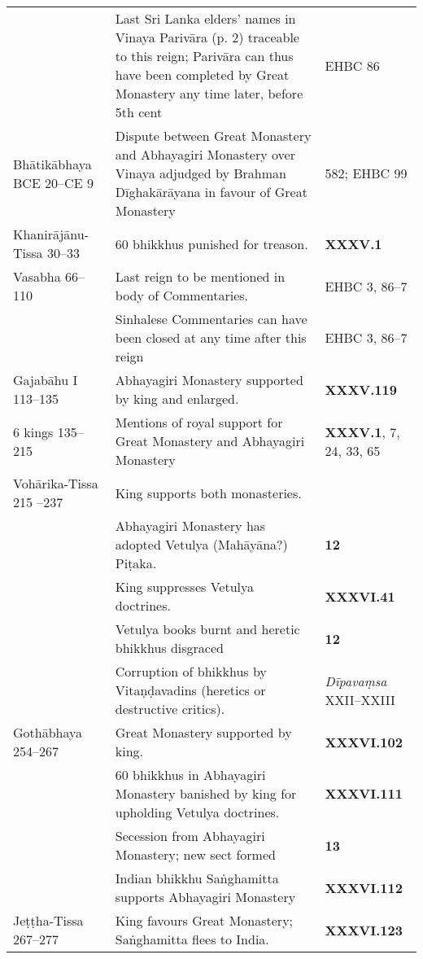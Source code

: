 \begin{tabular}{l|l|l}
     & Last Sri Lanka elders’ names in Vinaya Parivāra (p. 2) traceable to this reign; Parivāra can thus have been completed by Great Monastery any time later, before 5th cent   & EHBC 86\\
    Bhātikābhaya BCE 20–CE 9 & Dispute between Great Monastery and Abhayagiri Monastery over Vinaya adjudged by Brahman Dīghakārāyana in favour of Great Monastery  & \textbf{\cite{Vin-a}} 582; EHBC 99 \\
    Khanirājānu-Tissa 30–33 & 60 bhikkhus punished for treason. & \textbf{\cite{Mhv} XXXV.1}\\
    Vasabha  66–110   & Last reign to be mentioned in body of Commentaries.   & EHBC 3, 86–7 \\
     & Sinhalese Commentaries can have been closed at any time after this reign & EHBC 3, 86–7 \\
    Gajabāhu I  113–135   & Abhayagiri Monastery supported by king and enlarged.  & \textbf{\cite{Mhv} XXXV.119} \\
    6 kings  135–215   & Mentions of royal support for Great Monastery and Abhayagiri Monastery & \textbf{\cite{Mhv} XXXV.1}, 7, 24, 33, 65 \\
    Vohārika-Tissa 215 –237  & King supports both monasteries.  & \\
     & Abhayagiri Monastery has adopted Vetulya (Mahāyāna?) Piṭaka. & \textbf{\cite{Nikāya-s} 12}\\
     & King suppresses Vetulya doctrines. & \textbf{\cite{Mhv} XXXVI.41}\\
     & Vetulya books burnt and heretic bhikkhus disgraced   & \textbf{\cite{Nikāya-s} 12} \\
     & Corruption of bhikkhus by Vitaṇḍavadins (heretics or destructive critics).  & \emph{Dīpavaṃsa} XXII–XXIII\\
    Gothābhaya 254–267 & Great Monastery supported by king.  & \textbf{\cite{Mhv} XXXVI.102} \\
     & 60 bhikkhus in Abhayagiri Monastery banished by king for upholding Vetulya doctrines. & \textbf{\cite{Mhv} XXXVI.111}\\
     & Secession from Abhayagiri Monastery; new sect formed & \textbf{\cite{Nikāya-s} 13}\\
     & Indian bhikkhu Saṅghamitta supports Abhayagiri Monastery & \textbf{\cite{Mhv} XXXVI.112}\\
    Jeṭṭha-Tissa 267–277 & King favours Great Monastery; Saṅghamitta flees to India.  & \textbf{\cite{Mhv} XXXVI.123}  \\

\end{tabular}
